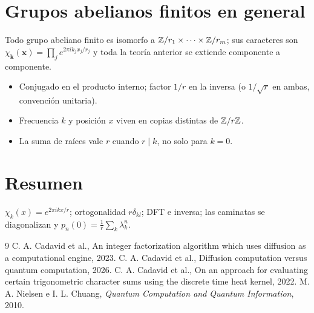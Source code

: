 \documentclass[11pt,a4paper]{article}
\begin{document}
\section{Grupos abelianos finitos en general}
Todo grupo abeliano finito es isomorfo a $\mathbb{Z}/r_1\times\dots\times\mathbb{Z}/r_m$; sus caracteres son
$\chi_{\mathbf k}(\mathbf x)=\prod_je^{2\pi ik_jx_j/r_j}$ y toda la teoría anterior se extiende componente a componente.

\begin{error}
\begin{itemize}[nosep]
\item Conjugado en el producto interno; factor $1/r$ en la inversa (o $1/\sqrt r$ en ambas, convención unitaria).
\item Frecuencia $k$ y posición $x$ viven en copias distintas de $\mathbb{Z}/r\mathbb{Z}$.
\item La suma de raíces vale $r$ cuando $r\mid k$, no solo para $k=0$.
\end{itemize}
\end{error}

\section{Resumen}
$\chi_k(x)=e^{2\pi ikx/r}$; ortogonalidad $r\delta_{kl}$; DFT e inversa; las caminatas se diagonalizan y
$p_n(0)=\frac1r\sum_k\lambda_k^n$.

\begin{thebibliography}{9}\small
{} C. A. Cadavid et al., An integer factorization algorithm which uses diffusion as a computational engine, 2023.
 C. A. Cadavid et al., Diffusion computation versus quantum computation, 2026.
 C. A. Cadavid et al., On an approach for evaluating certain trigonometric character sums using the discrete time heat kernel, 2022.
 M. A. Nielsen e I. L. Chuang, \emph{Quantum Computation and Quantum Information}, 2010.
\end{thebibliography}
\end{document}
